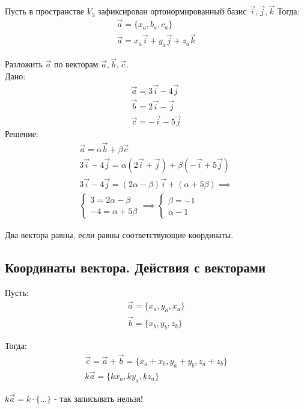 \begin{eg}
  Пусть в пространстве $V_3$ зафиксирован ортонормированный базис $\vec{i}, \vec{j}, \vec{k}$
  Тогда:
  \begin{gather*}
    \vec{a} = \{x_a, b_a, c_a\} \\
    \vec{a} = x_a \vec{i} + y_a \vec{j} + z_a \vec{k}
  \end{gather*}
\end{eg}

\exercise{}
Разложить $\vec{a}$ по векторам $\vec{a}, \vec{b}, \vec{c}$. \\
Дано:
\begin{gather*}
  \vec{a} = 3 \vec{i} - 4 \vec{j} \\
  \vec{b} = 2 \vec{i} -   \vec{j} \\
  \vec{c} = - \vec{i} - 5 \vec{j}
\end{gather*}
Решение:
\begin{gather*}
  \vec{a} = \alpha \vec{b} + \beta \vec{c} \\
  3 \vec{i} - 4 \vec{j} = \alpha(2 \vec{i} + \vec{j}) + \beta (- \vec{i} + 5 \vec{j}) \\
  3 \vec{i} - 4 \vec{j} = (2 \alpha - \beta) \vec{i} + (\alpha + 5 \beta) \implies \\
  \begin{cases}
    3 = 2 \alpha - \beta \\
    -4 = \alpha + 5 \beta
  \end{cases} \implies 
    \begin{cases}
      \beta = -1 \\
      \alpha - 1
    \end{cases}
\end{gather*}

\begin{note}
  Два вектора равны, если равны соответствующие координаты.
\end{note}

\subsection{Координаты вектора. Действия с векторами}

Пусть:
\begin{gather*}
  \vec{a} = \{x_a, y_a, x_a\} \\
  \vec{b} = \{x_b, y_b, z_b \}
\end{gather*}

Тогда:
\begin{gather*}
  \vec{c} = \vec{a} + \vec{b} = \{x_a + x_b, y_a + y_b, z_a + z_b\} \\ 
  k \vec{a} = \{k x_a, k y_a, k z_a\} 
\end{gather*}
\begin{note}
  $k \vec{a} = k \cdot \{ \ldots \} $ - так записывать нельзя!
\end{note}


